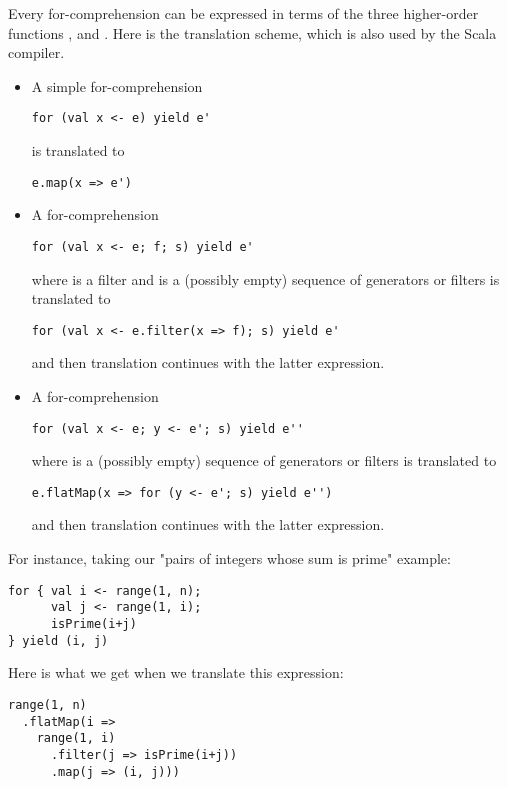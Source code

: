 Every for-comprehension can be expressed in terms of the three
higher-order functions ,  and .
Here is the translation scheme, which is also used by the Scala compiler.
\begin{itemize}
\item
A simple for-comprehension
\begin{lstlisting}
for (val x <- e) yield e'
\end{lstlisting}
is translated to
\begin{lstlisting}
e.map(x => e')
\end{lstlisting}
\item
A for-comprehension
\begin{lstlisting}
for (val x <- e; f; s) yield e'
\end{lstlisting}
where  is a filter and  is a (possibly empty)
sequence of generators or filters
is translated to
\begin{lstlisting}
for (val x <- e.filter(x => f); s) yield e'
\end{lstlisting}
and then translation continues with the latter expression.
\item
A for-comprehension
\begin{lstlisting}
for (val x <- e; y <- e'; s) yield e''
\end{lstlisting}
where  is a (possibly empty)
sequence of generators or filters
is translated to
\begin{lstlisting}
e.flatMap(x => for (y <- e'; s) yield e'')
\end{lstlisting}
and then translation continues with the latter expression.
\end{itemize}
For instance, taking our "pairs of integers whose sum is prime" example:
\begin{lstlisting}
for { val i <- range(1, n);
      val j <- range(1, i);
      isPrime(i+j)
} yield (i, j)
\end{lstlisting}
Here is what we get when we translate this expression:
\begin{lstlisting}
range(1, n)
  .flatMap(i =>
    range(1, i)
      .filter(j => isPrime(i+j))
      .map(j => (i, j)))
\end{lstlisting}

